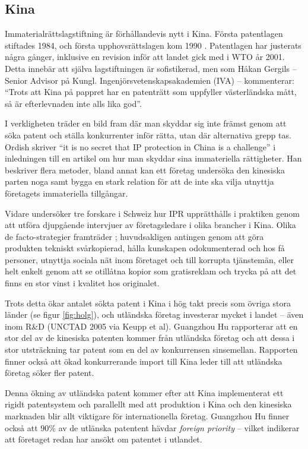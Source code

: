 
\subsection{Kina}

Immaterialrättslagstiftning är förhållandevis nytt i Kina. Första patentlagen stiftades 1984, och första upphovsrättslagen kom 1990 \cite{gergils}. Patentlagen har justerats några gånger, inklusive en revision inför att landet gick med i WTO år 2001. Detta innebär att själva lagstiftningen är sofistikerad, men som Håkan Gergils -- Senior Advisor på Kungl. Ingenjörsvetenskapsakademien (IVA) -- kommenterar: ``Trots att Kina på pappret har en patenträtt som uppfyller västerländska mått, så är 
efterlevnaden inte alls lika god''.

I verkligheten träder en bild fram där man skyddar sig inte främst genom att söka patent och ställa konkurrenter inför rätta, utan där alternativa grepp tas. Ordish skriver ``it is no secret that IP protection in China is a challenge'' \cite{ordish} i inledningen till en artikel om hur man skyddar sina immateriella rättigheter. Han beskriver flera metoder, bland annat kan ett företag undersöka den kinesiska parten noga samt bygga en stark relation för att de inte ska vilja utnyttja företagets immateriella tillgångar.

Vidare undersöker tre forskare i Schweiz hur IPR upprätthålls i praktiken genom att utföra djupgående intervjuer av företagsledare i olika brancher i Kina. Olika de facto-strategier framträder \cite{keupp}; huvudsakligen antingen genom att göra produkten tekniskt svårkopierad, hålla kunskapen odokumenterad och hos få personer, utnyttja sociala nät inom företaget och till korrupta tjänstemän, eller helt enkelt genom att se otillåtna kopior som gratisreklam och trycka på att det finns en stor vinst i kvalitet hos originalet.

Trots detta ökar antalet sökta patent i Kina i hög takt precis som övriga stora länder (se figur \ref{fig:holg}), och utländska företag investerar mycket i landet -- även inom R\&D (UNCTAD 2005 via Keupp et al). Guangzhou Hu rapporterar att en stor del av de kinesiska patenten kommer från utländska företag och att dessa i stor utsträckning tar patent som en del av konkurrensen sinsemellan\cite{hu}. Rapporten finner också att ökad konkurrerande import till Kina leder till att utländska företag söker fler patent.

Denna ökning av utländska patent kommer efter att Kina implementerat ett rigidt patentsystem och parallellt med att produktion i Kina och den kinesiska marknaden blir allt viktigare för internationella företag. Guangzhou Hu finner också att 90\% av de utlänska patentent hävdar \emph{foreign priority} -- vilket indikerar att företaget redan har ansökt om patentet i utlandet\cite{hu}. 
